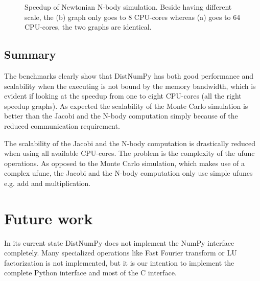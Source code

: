 \documentclass[10pt]{article}
\begin{document}
\begin{figure}%
  \begin{center}%
    \caption{Speedup of Newtonian N-body simulation. Beside having different scale, the (b) graph only goes to 8 CPU-cores whereas (a) goes to 64 CPU-cores, the two graphs are identical.}%
    \label{fig:NbodyScale}%
  \end{center}
\end{figure}


\subsection{Summary}
The benchmarks clearly show that DistNumPy has both good performance and scalability when the executing is not bound by the memory bandwidth, which is evident if looking at the speedup from one to eight CPU-cores (all the right speedup graphs). As expected the scalability of the Monte Carlo simulation is better than the Jacobi and the N-body computation simply because of the reduced communication requirement. 

The scalability of the Jacobi and the N-body computation is drastically reduced when using all available CPU-cores. The problem is the complexity of the ufunc operations. As opposed to the Monte Carlo simulation, which makes use of a complex ufunc, the Jacobi and the N-body computation only use simple ufuncs e.g. add and multiplication. 


\section{Future work}
In its current state DistNumPy does not implement the NumPy interface completely. Many specialized operations like Fast Fourier transform or LU factorization is not implemented, but it is our intention to implement the complete Python interface and most of the C interface.
\end{document}
